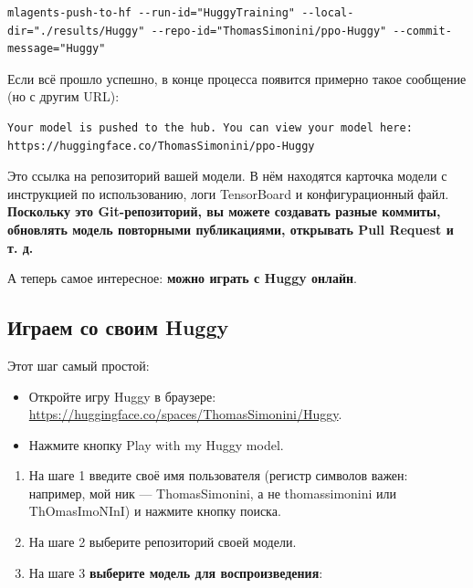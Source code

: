 \documentclass[11pt,a4paper]{article}
\begin{document}
\begin{lstlisting}
mlagents-push-to-hf --run-id="HuggyTraining" --local-dir="./results/Huggy" --repo-id="ThomasSimonini/ppo-Huggy" --commit-message="Huggy"
\end{lstlisting}

Если всё прошло успешно, в конце процесса появится примерно такое сообщение (но с другим URL):

\begin{lstlisting}
Your model is pushed to the hub. You can view your model here: https://huggingface.co/ThomasSimonini/ppo-Huggy
\end{lstlisting}

Это ссылка на репозиторий вашей модели. В нём находятся карточка модели с инструкцией по использованию, логи TensorBoard и конфигурационный файл. \textbf{Поскольку это Git-репозиторий, вы можете создавать разные коммиты, обновлять модель повторными публикациями, открывать Pull Request и т. д.}


А теперь самое интересное: \textbf{можно играть с Huggy онлайн}.

\subsection{Играем со своим Huggy}\label{play-with-your-huggy}

Этот шаг самый простой:

\begin{itemize}
\item
  Откройте игру Huggy в браузере: \url{https://huggingface.co/spaces/ThomasSimonini/Huggy}.
\item
  Нажмите кнопку Play with my Huggy model.
\end{itemize}


\begin{enumerate}
\def\labelenumi{\arabic{enumi}.}
\item
  На шаге 1 введите своё имя пользователя (регистр символов важен: например, мой ник --- ThomasSimonini, а не thomassimonini или ThOmasImoNInI) и нажмите кнопку поиска.
\item
  На шаге 2 выберите репозиторий своей модели.
\item
  На шаге 3 \textbf{выберите модель для воспроизведения}:
\end{enumerate}
\end{document}
